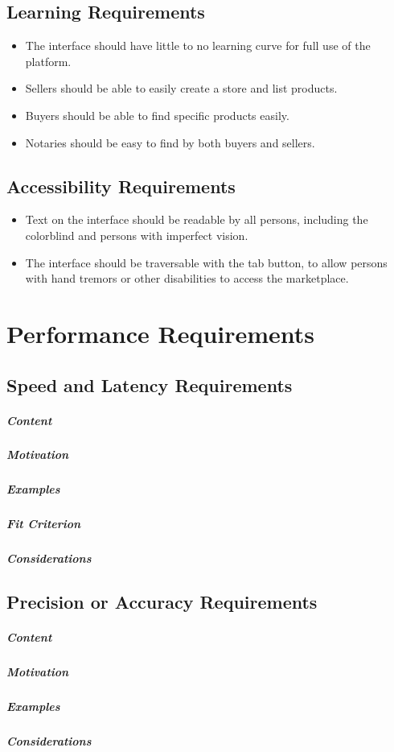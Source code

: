 \documentclass{article}
\begin{document}
\subsection{Learning Requirements}
\begin{itemize}
\item
The interface should have little to no learning curve for full use of the platform.

\item
Sellers should be able to easily create a store and list products.

\item
Buyers should be able to find specific products easily.

\item
Notaries should be easy to find by both buyers and sellers.
\end{itemize}


\subsection{Accessibility Requirements}
\begin{itemize}
\item
Text on the interface should be readable by all persons, including the colorblind and persons with imperfect vision.

\item
The interface should be traversable with the tab button, to allow persons with hand tremors or other disabilities to access the marketplace.


\end{itemize}

\section{Performance Requirements}
\subsection{Speed and Latency Requirements}
\subparagraph{Content}
\subparagraph{Motivation}
\subparagraph{Examples}
\subparagraph{Fit Criterion}
\subparagraph{Considerations}


\subsection{Precision or Accuracy Requirements}
\subparagraph{Content}
\subparagraph{Motivation}
\subparagraph{Examples}
\subparagraph{Considerations}
\end{document}
